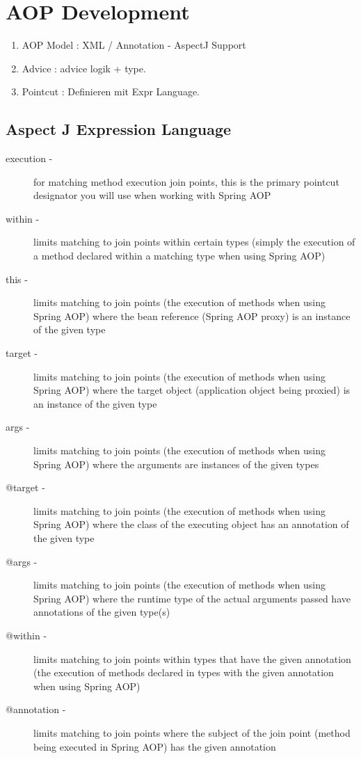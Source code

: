 \documentclass[a4paper,10pt]{scrreprt}
\begin{document}
\section{AOP Development}
\begin{enumerate}
 \item AOP Model : XML / Annotation - AspectJ Support
 \item Advice : advice logik + type.
 \item Pointcut : Definieren mit Expr Language.
\end{enumerate}

\subsection{Aspect J Expression Language}
\begin{description}
 \item [execution -] for matching method execution join points, this is the primary pointcut designator
you will use when working with Spring AOP
\item [within -] limits matching to join points within certain types (simply the execution of a method
declared within a matching type when using Spring AOP)
\item[this -] limits matching to join points (the execution of methods when using Spring AOP) where the
bean reference (Spring AOP proxy) is an instance of the given type
\item[target -] limits matching to join points (the execution of methods when using Spring AOP) where the
target object (application object being proxied) is an instance of the given type
\item[args -] limits matching to join points (the execution of methods when using Spring AOP) where the
arguments are instances of the given types
\item[@target -] limits matching to join points (the execution of methods when using Spring AOP) where
the class of the executing object has an annotation of the given type
\item[@args -] limits matching to join points (the execution of methods when using Spring AOP) where the
runtime type of the actual arguments passed have annotations of the given type(s)
\item[@within -] limits matching to join points within types that have the given annotation (the execution of
methods declared in types with the given annotation when using Spring AOP)
\item[@annotation -] limits matching to join points where the subject of the join point (method being
executed in Spring AOP) has the given annotation
\end{description}
\pagebreak
\end{document}
